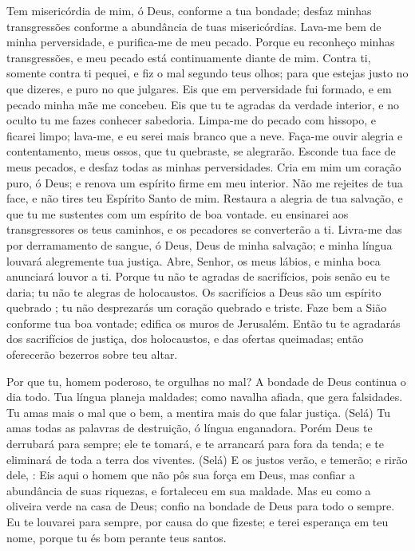 {\PP 
  Tem misericórdia de mim, ó Deus, conforme a tua bondade; desfaz minhas transgressões conforme a abundância de tuas misericórdias.
  Lava-me bem de minha perversidade, e purifica-me de meu pecado.
  Porque eu reconheço minhas transgressões, e meu pecado está continuamente diante de mim.
  Contra ti, somente contra ti pequei, e fiz o mal segundo teus olhos; para que estejas justo no que dizeres, e puro no que julgares.
  Eis que em perversidade fui formado, e em pecado minha mãe me concebeu.
  Eis que tu te agradas da verdade interior, e no oculto tu me fazes conhecer sabedoria.
  Limpa-me do pecado com hissopo, e ficarei limpo; lava-me, e eu serei mais branco que a neve.
  Faça-me ouvir alegria e contentamento,
{} meus ossos, que tu quebraste, se alegrarão.
  Esconde tua face de meus pecados, e desfaz todas as minhas perversidades.
  Cria em mim um coração puro, ó Deus; e renova um espírito firme em meu interior.
  Não me rejeites de tua face, e não tires teu Espírito Santo de mim.
  Restaura a alegria de tua salvação, e que tu me sustentes com um espírito de boa vontade.
   eu ensinarei aos transgressores os teus caminhos, e os pecadores se converterão a ti.
  Livra-me das
{} por derramamento de sangue, ó Deus, Deus de minha salvação; e minha língua louvará alegremente tua justiça.
  Abre, Senhor, os meus lábios, e minha boca anunciará louvor a ti.
  Porque tu não te agradas de sacrifícios, pois senão eu te daria; tu não te alegras de holocaustos.
  Os sacrifícios a Deus são um espírito quebrado
{} ; tu não desprezarás um coração quebrado e triste.
  Faze bem a Sião conforme tua boa vontade; edifica os muros de Jerusalém.
  Então tu te agradarás dos sacrifícios de justiça, dos holocaustos, e das ofertas queimadas; então oferecerão bezerros sobre teu altar.
\par }


{\PP 
  Por que tu, homem poderoso, te orgulhas no mal? A bondade de Deus continua o dia todo.
  Tua língua planeja maldades;
{} como navalha afiada, que gera falsidades.
  Tu amas mais o mal que o bem,
{} a mentira mais do que falar justiça. (Selá)
  Tu amas todas as palavras de destruição, ó língua enganadora.
  Porém Deus te derrubará para sempre; ele te tomará, e te arrancará para fora da tenda; e te eliminará de toda a terra dos viventes. (Selá)
  E os justos
{} verão, e temerão; e rirão dele,
{} :
  Eis aqui o homem que não pôs sua força em Deus, mas
{} confiar a abundância de suas riquezas, e fortaleceu em sua maldade.
  Mas eu
{} como a oliveira verde na casa de Deus; confio na bondade de Deus para todo o sempre.
  Eu te louvarei para sempre, por causa do que fizeste; e terei esperança em teu nome, porque tu és bom perante teus santos.
\par }


